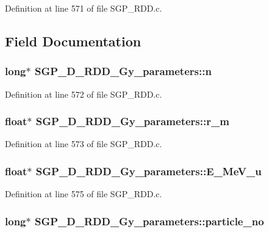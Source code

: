 Definition at line 571 of file SGP\_\-RDD.c.

\subsection{Field Documentation}
\hypertarget{structSGP__D__RDD__Gy__parameters_8e6d1eeb1e3dfd2574e37f3a557f02f5}{
\subsubsection[n]{\setlength{\rightskip}{0pt plus 5cm}long$\ast$ {\bf SGP\_\-D\_\-RDD\_\-Gy\_\-parameters::n}}}
\label{d8/d35/structSGP__D__RDD__Gy__parameters_8e6d1eeb1e3dfd2574e37f3a557f02f5}




Definition at line 572 of file SGP\_\-RDD.c.\hypertarget{structSGP__D__RDD__Gy__parameters_a8aceb6c6d008a7cab1a490ad38ce886}{
\subsubsection[r\_\-m]{\setlength{\rightskip}{0pt plus 5cm}float$\ast$ {\bf SGP\_\-D\_\-RDD\_\-Gy\_\-parameters::r\_\-m}}}
\label{d8/d35/structSGP__D__RDD__Gy__parameters_a8aceb6c6d008a7cab1a490ad38ce886}




Definition at line 573 of file SGP\_\-RDD.c.\hypertarget{structSGP__D__RDD__Gy__parameters_4c6885f08aaf387fd45baea38a76375a}{
\subsubsection[E\_\-MeV\_\-u]{\setlength{\rightskip}{0pt plus 5cm}float$\ast$ {\bf SGP\_\-D\_\-RDD\_\-Gy\_\-parameters::E\_\-MeV\_\-u}}}
\label{d8/d35/structSGP__D__RDD__Gy__parameters_4c6885f08aaf387fd45baea38a76375a}




Definition at line 575 of file SGP\_\-RDD.c.\hypertarget{structSGP__D__RDD__Gy__parameters_7f85be3a87f0c96ce67a8db351a0cd3f}{
\subsubsection[particle\_\-no]{\setlength{\rightskip}{0pt plus 5cm}long$\ast$ {\bf SGP\_\-D\_\-RDD\_\-Gy\_\-parameters::particle\_\-no}}}
\label{d8/d35/structSGP__D__RDD__Gy__parameters_7f85be3a87f0c96ce67a8db351a0cd3f}




